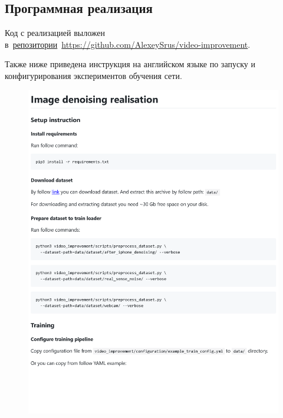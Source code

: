 \begin{appendices}

\section{Программная реализация}


Код с реализацией выложен в~\href{https://github.com/AlexeySrus/video-improvement}{репозитории}~\url{https://github.com/AlexeySrus/video-improvement}. 

Также ниже приведена инструкция на английском языке по запуску и конфигурирования  экспериментов обучения сети.


\begin{figure}[h]
	\centering
	\includegraphics[width=\textwidth]{img/markdown/README_1}
	\label{fig:markdown_1}
\end{figure}


\end{appendices}
